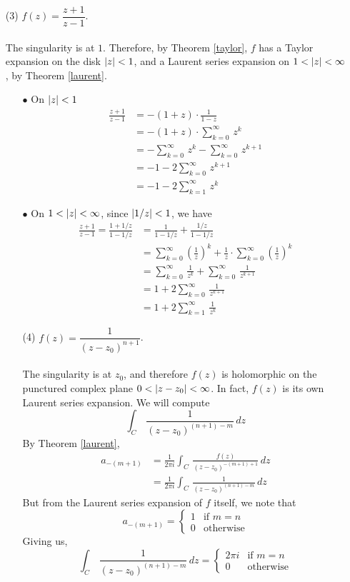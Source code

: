 \begin{example}
\begin{itemize}[itemsep=1em]
\item[(3)] $f(z) = \dfrac{z + 1}{z - 1}$.\\
\\
The singularity is at $1$. Therefore, by Theorem \ref{taylor}, $f$ has a Taylor expansion on the disk $\left\lvert z\right\rvert < 1$, and a Laurent series expansion on $1 < \left\lvert z\right\rvert < \infty$, by Theorem \ref{laurent}.
\begin{itemize}
\item[$\bullet$] On $\left\lvert z\right\rvert < 1$
\begin{align*}
\frac{z + 1}{z - 1} &= -(1 + z)\cdot\frac{1}{1 - z}\\[0.5em]
 &= -(1 + z)\cdot\sum_{k=0}^\infty\,z^k\\[0.5em]
 &= -\sum_{k=0}^\infty\,z^k - \sum_{k=0}^\infty\,z^{k+1}\\[0.5em]
 &= -1 - 2\sum_{k=0}^\infty\,z^{k+1}\\[0.5em]
 &= -1 - 2\sum_{k=1}^\infty\,z^k
\end{align*}

\item[$\bullet$] On $1 < \left\lvert z\right\rvert < \infty$, since $\left\lvert1/z\right\rvert < 1$, we have
\begin{align*}
\frac{z + 1}{z - 1} = \frac{1 + 1/z}{1 - 1/z} &= \frac{1}{1 - 1/z} + \frac{1/z}{1 - 1/z}\\[0.5em]
 &= \sum_{k=0}^\infty\left(\frac{1}{z}\right)^k + \frac{1}{z}\cdot\sum_{k=0}^\infty\left(\frac{1}{z}\right)^k\\[0.5em]
 &= \sum_{k=0}^\infty\,\frac{1}{z^k} + \sum_{k=0}^\infty\,\frac{1}{z^{k+1}}\\[0.5em]
 &= 1 + 2\sum_{k=0}^\infty\,\frac{1}{z^{k+1}}\\[0.5em]
 &= 1 + 2\sum_{k=1}^\infty\,\frac{1}{z^k}
\end{align*}

\item[(4)] $f(z) = \dfrac{1}{(z - z_0)^{n + 1}}$.\\
\\
The singularity is at $z_0$, and therefore $f(z)$ is holomorphic on the punctured complex plane $0 < \left\lvert z - z_0\right\rvert < \infty$. In fact, $f(z)$ is its own Laurent series expansion. We will compute
\[\int_C\,\frac{1}{(z - z_0)^{(n + 1) - m}}\,dz\]
By Theorem \ref{laurent},
\begin{align*}
a_{-(m+1)} &= \frac{1}{2\pi i}\int_C\,\frac{f(z)}{(z - z_0)^{-(m+1) + 1}}\,dz\\[1em]
 &= \frac{1}{2\pi i}\int_C\,\frac{1}{(z - z_0)^{(n + 1) - m}}\,dz
\end{align*}
But from the Laurent series expansion of $f$ itself, we note that
\[a_{-(m+1)} = \begin{cases}1 & \text{if }m = n\\[0.5em] 0 & \text{otherwise} \end{cases}\]
Giving us, 
\[\int_C\,\frac{1}{(z - z_0)^{(n + 1) - m}}\,dz = \begin{cases}2\pi i & \text{if }m = n\\[0.5em] 0 & \text{otherwise} \end{cases}\]
\end{itemize}


\end{itemize}
\end{example}
